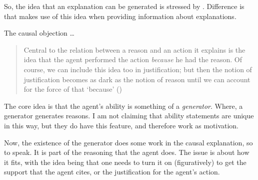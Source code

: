 \documentclass[10pt]{article}
\begin{document}
\begin{note}[Davidson]
  So, the idea that an explanation can be generated is stressed by \citeauthor{Davidson:2001aa}.
  Difference is that \citeauthor{Davidson:2001aa} makes use of this idea when providing information about explanations.


  {
    \color{red}
    The causal objection \dots
  }
  \begin{quote}
    Central to the relation between a reason and an action it explains is the idea that the agent performed the action \emph{because} he had the reason.
    Of course, we can include this idea too in justification; but then the notion of justification becomes as dark as the notion of reason until we can account for the force of that ‘because’\nolinebreak
    \mbox{}\hfill(\citeyear[9]{Davidson:2001aa})
  \end{quote}
\end{note}

\begin{note}[Generator]
  The core idea is that the agent's ability is something of a \emph{generator}.
  Where, a generator generates reasons.
  I am not claiming that ability statements are unique in this way, but they do have this feature, and therefore work as motivation.

  Now, the existence of the generator does some work in the causal explanation, so to speak.
  It is part of the reasoning that the agent does.
  The issue is about how it fits, with the idea being that one needs to turn it on (figuratively) to get the support that the agent cites, or the justification for the agent's action.
\end{note}
\end{document}
